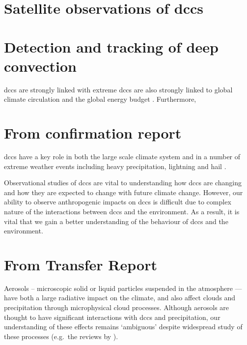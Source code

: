 \section{Satellite observations of \acrshort{dcc}s}



\section{Detection and tracking of deep convection}





\acrshort{dcc}s are strongly linked with extreme  
\acrshort{dcc}s are also strongly linked to global climate circulation and the global energy budget \citep{houze_mesoscale_2004, fritsch_mesoscale_2001, johnson_mesoscale_2001}.
Furthermore, 

\section{From confirmation report}

\acrshort{dcc}s have a key role in both the large scale climate system and in a number of extreme weather events including heavy precipitation, lightning and hail \citep[e.g.][]{westra_future_2014, houze_chapter_2014, williams_radar_1992, bruning_theory_2013, punge_hail_2016, matsudo_severe_2011}.

Observational studies of \acrshort{dcc}s are vital to understanding how \acrshort{dcc}s are changing and how they are expected to change with future climate change.
However, our ability to observe anthropogenic impacts on \acrshort{dcc}s is difficult due to complex nature of the interactions between \acrshort{dcc}s and the environment.
As a result, it is vital that we gain a better understanding of the behaviour of \acrshort{dcc}s and the environment.








\section{From Transfer Report}

Aerosols – microscopic solid or liquid particles suspended in the atmosphere --- have both a large radiative  impact on the climate, and also affect clouds and precipitation through microphysical cloud processes. 
Although aerosols are thought to have significant interactions with \acrshort{dcc}s and precipitation, our understanding of these effects remains ‘ambiguous’ \citep{IPCCCloudsAeorosolsBoucher2013} despite widespread study of these processes (e.g.\ the reviews by \citet{levin_aerosol_2008, tao_impact_2012, fan_review_2016}).


